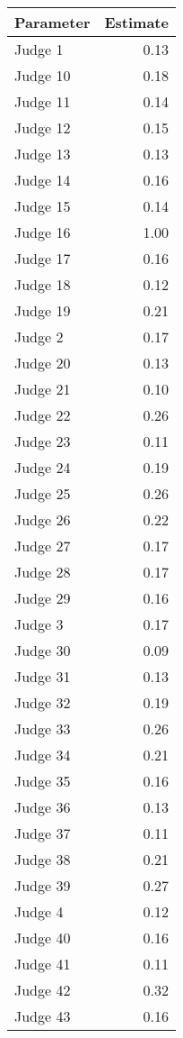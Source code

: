 \begin{tabular}{lr}
\toprule
Parameter &  Estimate \\
\midrule
  Judge 1 &      0.13 \\
 Judge 10 &      0.18 \\
 Judge 11 &      0.14 \\
 Judge 12 &      0.15 \\
 Judge 13 &      0.13 \\
 Judge 14 &      0.16 \\
 Judge 15 &      0.14 \\
 Judge 16 &      1.00 \\
 Judge 17 &      0.16 \\
 Judge 18 &      0.12 \\
 Judge 19 &      0.21 \\
  Judge 2 &      0.17 \\
 Judge 20 &      0.13 \\
 Judge 21 &      0.10 \\
 Judge 22 &      0.26 \\
 Judge 23 &      0.11 \\
 Judge 24 &      0.19 \\
 Judge 25 &      0.26 \\
 Judge 26 &      0.22 \\
 Judge 27 &      0.17 \\
 Judge 28 &      0.17 \\
 Judge 29 &      0.16 \\
  Judge 3 &      0.17 \\
 Judge 30 &      0.09 \\
 Judge 31 &      0.13 \\
 Judge 32 &      0.19 \\
 Judge 33 &      0.26 \\
 Judge 34 &      0.21 \\
 Judge 35 &      0.16 \\
 Judge 36 &      0.13 \\
 Judge 37 &      0.11 \\
 Judge 38 &      0.21 \\
 Judge 39 &      0.27 \\
  Judge 4 &      0.12 \\
 Judge 40 &      0.16 \\
 Judge 41 &      0.11 \\
 Judge 42 &      0.32 \\
 Judge 43 &      0.16 \\

\end{tabular}
